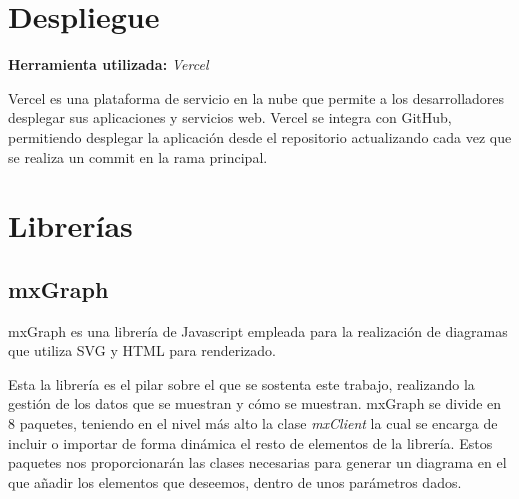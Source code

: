 \section{Despliegue}
\textbf{Herramienta utilizada: }\emph{Vercel}

Vercel es una plataforma de servicio en la nube que permite a los desarrolladores desplegar sus aplicaciones y servicios web. Vercel se integra con GitHub, permitiendo desplegar la aplicación desde el repositorio actualizando cada vez que se realiza un commit en la rama principal.

\section{Librerías}
\subsection{mxGraph}

mxGraph es una librería de Javascript empleada para la realización de diagramas que utiliza SVG y HTML para renderizado.

Esta la librería es el pilar sobre el que se sostenta este trabajo, realizando la gestión de los datos que se muestran y cómo se muestran. mxGraph se divide en 8 paquetes, teniendo en el nivel más alto la clase \emph{mxClient} la cual se encarga de incluir o importar de forma dinámica el resto de elementos de la librería. Estos paquetes nos proporcionarán las clases necesarias para generar un diagrama en el que añadir los elementos que deseemos, dentro de unos parámetros dados\cite{mxg-api}.